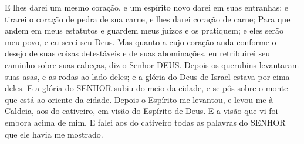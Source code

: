 {  E lhes darei um mesmo coração, e um espírito novo darei em suas entranhas; e tirarei o coração de pedra de sua carne, e lhes darei coração de carne;
  Para que andem em meus estatutos e guardem meus juízos e os pratiquem; e eles serão meu povo, e eu serei seu Deus.
  Mas quanto a
{} cujo coração anda conforme o desejo de suas coisas detestáveis e de suas abominações, eu retribuirei seu caminho sobre suas cabeças, diz o Senhor DEUS.
  Depois os querubins levantaram suas asas, e as rodas ao lado deles; e a glória do Deus de Israel estava por cima deles.
  E a glória do SENHOR subiu do meio da cidade, e se pôs sobre o monte que está ao oriente da cidade.
  Depois o Espírito me levantou, e levou-me à Caldeia, aos do cativeiro, em visão do Espírito de Deus. E a visão que vi foi embora acima de mim.
  E falei aos do cativeiro todas as palavras do SENHOR que ele havia me mostrado.
\par }

